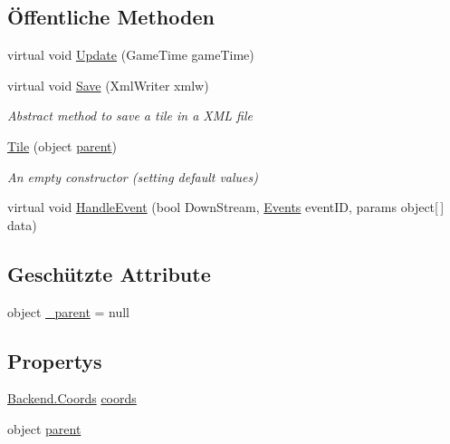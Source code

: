 \subsection*{Öffentliche Methoden}
\begin{DoxyCompactItemize}
\item 
virtual void \hyperlink{class_gruppe22_1_1_backend_1_1_tile_a0810154a52f859e852497e3717998e47}{Update} (Game\-Time game\-Time)
\item 
virtual void \hyperlink{class_gruppe22_1_1_backend_1_1_tile_a109ab3e77ffca9d44c95a711af3491dc}{Save} (Xml\-Writer xmlw)
\begin{DoxyCompactList}\small\item\em Abstract method to save a tile in a X\-M\-L file \end{DoxyCompactList}\item 
\hyperlink{class_gruppe22_1_1_backend_1_1_tile_aff91899925757cb0d274f3beaa51db79}{Tile} (object \hyperlink{class_gruppe22_1_1_backend_1_1_tile_abc12933c70eb3a2ebbb2fde9f45c2632}{parent})
\begin{DoxyCompactList}\small\item\em An empty constructor (setting default values) \end{DoxyCompactList}\item 
virtual void \hyperlink{class_gruppe22_1_1_backend_1_1_tile_a6bd5672c460c2e496dcaa483aa5e8438}{Handle\-Event} (bool Down\-Stream, \hyperlink{namespace_gruppe22_1_1_backend_ab56df91bb0bdafa1ea978e552209ce73}{Events} event\-I\-D, params object\mbox{[}$\,$\mbox{]} data)
\end{DoxyCompactItemize}
\subsection*{Geschützte Attribute}
\begin{DoxyCompactItemize}
\item 
object \hyperlink{class_gruppe22_1_1_backend_1_1_tile_aee3960c872a95f378086b1655caddbcb}{\-\_\-parent} = null
\end{DoxyCompactItemize}
\subsection*{Propertys}
\begin{DoxyCompactItemize}
\item 
\hyperlink{class_gruppe22_1_1_backend_1_1_coords}{Backend.\-Coords} \hyperlink{class_gruppe22_1_1_backend_1_1_tile_a0fd463d0eb3f37522d0e4ff6692b9fcd}{coords}
\item 
object \hyperlink{class_gruppe22_1_1_backend_1_1_tile_abc12933c70eb3a2ebbb2fde9f45c2632}{parent}
\end{DoxyCompactItemize}


